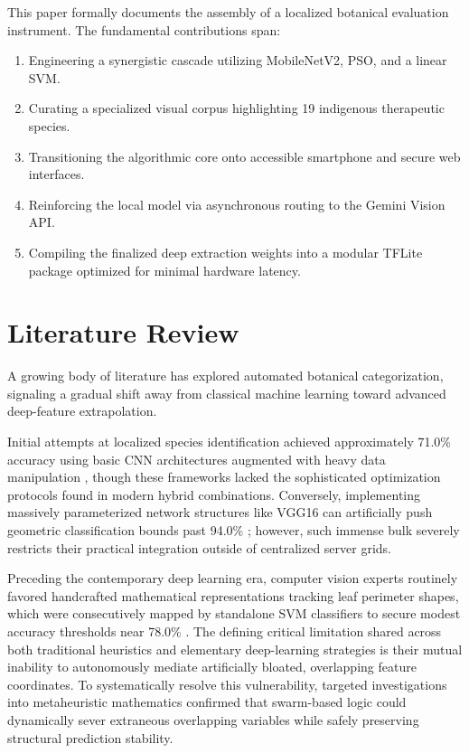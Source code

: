 \documentclass[conference]{IEEEtran}
\begin{document}
This paper formally documents the assembly of a localized botanical evaluation instrument. The fundamental contributions span:
\begin{enumerate}
    \item Engineering a synergistic cascade utilizing MobileNetV2, PSO, and a linear SVM.
    \item Curating a specialized visual corpus highlighting 19 indigenous therapeutic species.
    \item Transitioning the algorithmic core onto accessible smartphone and secure web interfaces.
    \item Reinforcing the local model via asynchronous routing to the Gemini Vision API.
    \item Compiling the finalized deep extraction weights into a modular TFLite package optimized for minimal hardware latency.
\end{enumerate}

\section{Literature Review}

A growing body of literature has explored automated botanical categorization, signaling a gradual shift away from classical machine learning toward advanced deep-feature extrapolation. 

Initial attempts at localized species identification achieved approximately 71.0\% accuracy using basic CNN architectures augmented with heavy data manipulation \cite{akter2021}, though these frameworks lacked the sophisticated optimization protocols found in modern hybrid combinations. Conversely, implementing massively parameterized network structures like VGG16 can artificially push geometric classification bounds past 94.0\% \cite{srivastava2020}; however, such immense bulk severely restricts their practical integration outside of centralized server grids.

Preceding the contemporary deep learning era, computer vision experts routinely favored handcrafted mathematical representations tracking leaf perimeter shapes, which were consecutively mapped by standalone SVM classifiers to secure modest accuracy thresholds near 78.0\% \cite{ganesh2019}. The defining critical limitation shared across both traditional heuristics and elementary deep-learning strategies is their mutual inability to autonomously mediate artificially bloated, overlapping feature coordinates. To systematically resolve this vulnerability, targeted investigations into metaheuristic mathematics \cite{zhang2018} confirmed that swarm-based logic could dynamically sever extraneous overlapping variables while safely preserving structural prediction stability.
\end{document}
